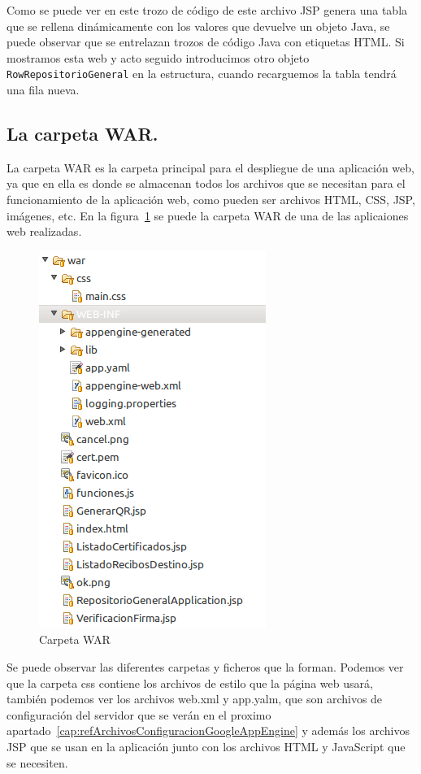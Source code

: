 Como se puede ver en este trozo de código de este archivo JSP genera una tabla que se rellena dinámicamente con los valores que devuelve un objeto Java, se puede observar que se entrelazan trozos de código Java con etiquetas HTML. Si mostramos esta web y acto seguido introducimos otro objeto \lstinline{RowRepositorioGeneral} en la estructura, cuando recarguemos la tabla tendrá una fila nueva.

\subsection{La carpeta WAR.}

La carpeta WAR es la carpeta principal para el despliegue de una aplicación web, ya que en ella es donde se almacenan todos los archivos que se necesitan para el funcionamiento de la aplicación web, como pueden ser archivos HTML, CSS, JSP, imágenes, etc. En la figura~\ref{fig:carpetawar} se puede la carpeta WAR de una de las aplicaiones web realizadas.

\begin{figure}
  \centering
    \includegraphics{./GoogleAppEngine/imagenes/carpetawar.png}
  \caption{Carpeta WAR}
  \label{fig:carpetawar}
\end{figure}

Se puede observar las diferentes carpetas y ficheros que la forman. Podemos ver que la carpeta css contiene los archivos de estilo que la página web usará, también podemos ver los archivos web.xml y app.yalm, que son archivos de configuración del servidor que se verán en el proximo apartado~\ref{cap:refArchivosConfiguracionGoogleAppEngine} y además los archivos JSP que se usan en la aplicación junto con los archivos HTML y JavaScript que se necesiten.

